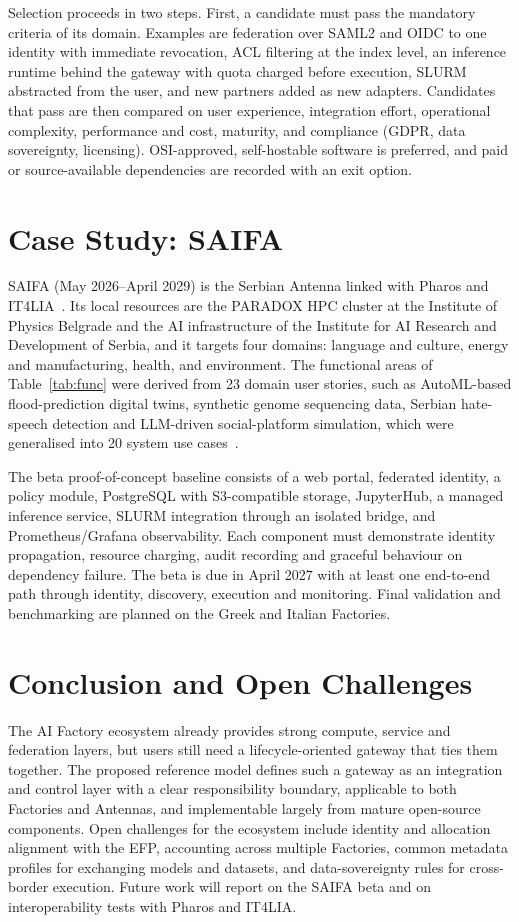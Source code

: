 \documentclass[conference,a4paper]{IEEEtran}
\begin{document}
Selection proceeds in two steps. First, a candidate must pass the mandatory criteria of its domain. Examples are federation over SAML2 and OIDC to one identity with immediate revocation, ACL filtering at the index level, an inference runtime behind the gateway with quota charged before execution, SLURM abstracted from the user, and new partners added as new adapters. Candidates that pass are then compared on user experience, integration effort, operational complexity, performance and cost, maturity, and compliance (GDPR, data sovereignty, licensing). OSI-approved, self-hostable software is preferred, and paid or source-available dependencies are recorded with an exit option.

\section{Case Study: SAIFA}
\label{sec:saifa}

SAIFA (May 2026--April 2029) is the Serbian Antenna linked with Pharos and IT4LIA~\cite{cordis_saifa}. Its local resources are the PARADOX HPC cluster at the Institute of Physics Belgrade and the AI infrastructure of the Institute for AI Research and Development of Serbia, and it targets four domains: language and culture, energy and manufacturing, health, and environment. The functional areas of Table~\ref{tab:func} were derived from 23 domain user stories, such as AutoML-based flood-prediction digital twins, synthetic genome sequencing data, Serbian hate-speech detection and LLM-driven social-platform simulation, which were generalised into 20 system use cases~\cite{saifa_d31}.

The beta proof-of-concept baseline consists of a web portal, federated identity, a policy module, PostgreSQL with S3-compatible storage, JupyterHub, a managed inference service, SLURM integration through an isolated bridge, and Prometheus/Grafana observability. Each component must demonstrate identity propagation, resource charging, audit recording and graceful behaviour on dependency failure. The beta is due in April 2027 with at least one end-to-end path through identity, discovery, execution and monitoring. Final validation and benchmarking are planned on the Greek and Italian Factories.

\section{Conclusion and Open Challenges}

The AI Factory ecosystem already provides strong compute, service and federation layers, but users still need a lifecycle-oriented gateway that ties them together. The proposed reference model defines such a gateway as an integration and control layer with a clear responsibility boundary, applicable to both Factories and Antennas, and implementable largely from mature open-source components. Open challenges for the ecosystem include identity and allocation alignment with the EFP, accounting across multiple Factories, common metadata profiles for exchanging models and datasets, and data-sovereignty rules for cross-border execution. Future work will report on the SAIFA beta and on interoperability tests with Pharos and IT4LIA.



\end{document}
